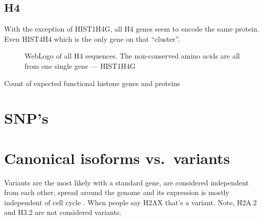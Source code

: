 \documentclass[10pt,a4paper,draft,article]{memoir}
\begin{document}
    \subsection{H4}
      With the exception of HIST1H4G, all H4 genes seem to encode the same protein. Even HIST4H4 which is the
      only gene on that ``cluster''.
      \begin{figure}
        \centering
        \caption{WebLogo of all H4 sequences. The non-conserved amino acids are all from one single gene --- HIST1H4G}
        \label{fig:h4-weblogo}
      \end{figure}

      \begin{table}
        \centering
%        
        \caption{Count of expected functional histone genes and proteins}
        \label{tab:H4-consensus}
      \end{table}

  \section{SNP's}

  \section{Canonical isoforms vs.~variants}

    Variants are the most likely with a standard gene, are considered independent from each other,
    spread around the genome and its expression is mostly independent of cell cycle . When people say H2AX that's
    a variant. Note, H2A.2 and H3.2 are not considered variants.
\end{document}
